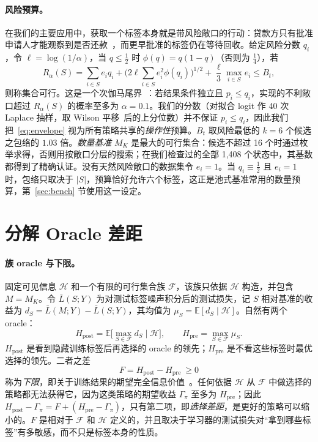 \documentclass[runningheads]{llncs}
\newcommand{\Hpost}{H_{\mathrm{post}}}
\newcommand{\Hpre}{H_{\mathrm{pre}}}
\begin{document}
\paragraph{风险预算。}在我们的主要应用中，获取一个标签本身就是带风险敞口的行动：贷款方只有批准申请人才能观察到是否还款~\cite{lakkaraju2017selective,wei2021selective}，而更早批准的标签仍在等待回收。给定风险分数 $q_i$，令 $\ell=\log(1/\alpha)$，当 $q\le\frac12$ 时 $\phi(q)=q(1-q)$（否则为 $\frac14$），若
\begin{equation}
 R_\alpha(S)=\sum_{i\in S}e_iq_i+\Big(2\ell\sum_{i\in S}e_i^2\phi(q_i)\Big)^{1/2}+\frac{\ell}{3}\max_{i\in S}e_i\le B_t ,
 \label{eq:envelope}
\end{equation}
则称集合可行。这是一个次伽马尾界~\cite{boucheron2013concentration}：若结果条件独立且 $p_i\le q_i$，实现的不利敞口超过 $R_\alpha(S)$ 的概率至多为 $\alpha=0.1$。我们的分数（对拟合 logit 作 40 次 Laplace 抽样，取 Wilson 平移~\cite{wilson1927probable}后的上分位数）并不保证 $p_i\le q_i$，因此我们把~\eqref{eq:envelope} 视为所有策略共享的\emph{操作性}预算。$B_t$ 取风险最低的 $k=6$ 个候选之包络的 $1.03$ 倍。\emph{数量基准} $M_K$ 是最大的可行集合：候选不超过 16 个时通过枚举求得，否则用按敞口分层的搜索；在我们检查过的全部 1{,}408 个状态中，其基数都得到了精确认证。没有天然风险敞口的数据集令 $e_i=1$。当 $q_i\equiv\frac12$ 且 $e_i=1$ 时，包络只取决于 $|S|$，预算恰好允许六个标签，这正是池式基准常用的数量预算，第~\ref{sec:bench} 节使用这一设定。

\section{分解 Oracle 差距}
\label{sec:protocol}
\paragraph{族 oracle 与下限。}固定可见信息 $\mathcal H$ 和一个有限的可行集合族 $\mathcal F$，该族只依据 $\mathcal H$ 构造，并包含 $M=M_K$。令 $\bar L(S;Y)$ 为对测试标签噪声积分后的测试损失，记 $S$ 相对基准的收益为 $d_S=\bar L(M;Y)-\bar L(S;Y)$，其均值为 $\mu_S=\mathbb E[d_S\mid\mathcal H]$。自然有两个 oracle：
\begin{equation}
 \Hpost=\mathbb E\big[\max_{S\in\mathcal F}d_S\mid\mathcal H\big],\qquad
 \Hpre=\max_{S\in\mathcal F}\mu_S .
\end{equation}
$\Hpost$ 是看到隐藏训练标签后再选择的 oracle 的领先；$\Hpre$ 是不看这些标签时最优选择的领先。二者之差
\begin{equation}
 F=\Hpost-\Hpre\ \ge 0
\end{equation}
称为\emph{下限}，即关于训练结果的期望完全信息价值~\cite{howard1966information,raiffa1961applied}。任何依据 $\mathcal H$ 从 $\mathcal F$ 中做选择的策略都无法获得它，因为这类策略的期望收益 $\Gamma_\pi$ 至多为 $\Hpre$；因此 $\Hpost-\Gamma_\pi=F+(\Hpre-\Gamma_\pi)$，只有第二项，即\emph{选择差距}，是更好的策略可以缩小的。$F$ 是相对于 $\mathcal F$ 和 $\mathcal H$ 定义的，并且取决于学习器的测试损失对“拿到哪些标签”有多敏感，而不只是标签本身的性质。
\end{document}
